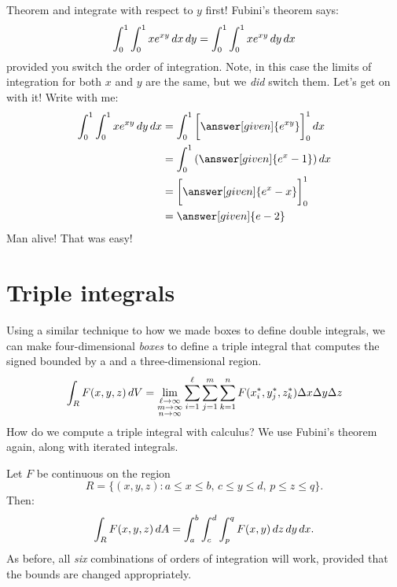 \documentclass{ximera}
\begin{document}
\begin{example}
\begin{explanation}
    Theorem and integrate with respect to $y$ first! Fubini's theorem says:
    \[
    \int_0^1 \int_0^1 x e^{xy} \mathop{}\!d x \mathop{}\!d y =  \int_0^1 \int_0^1 x e^{xy} \mathop{}\!d y \mathop{}\!d x
    \]
    provided you switch the order of integration. Note, in this case
    the limits of integration for both $x$ and $y$ are the same, but
    we \textit{did} switch them. Let's get on with it! Write with me:
    \begin{align*}
      \int_0^1 \int_0^1 x e^{xy} \d y \d x &= \int_0^1 \eval{\answer[given]{e^{xy}}}_0^1\d x\\
      &= \int_0^1 \left(\answer[given]{e^x - 1}\right) \d x \\
      &= \eval{\answer[given]{e^x - x}}_0^1\\
      &= \answer[given]{e-2}
    \end{align*}
    Man alive! That was easy!
  \end{explanation}
\end{example}



\section{Triple integrals}

Using a similar technique to how we made boxes to define double
integrals, we can make four-dimensional \textit{boxes} to define a
triple integral that computes the signed
bounded by a
and a three-dimensional region.
\[
\int_R F(x,y,z) \mathop{}\!d V = \lim_{\substack{\ell\to\infty\\ m\to\infty\\ n\to\infty}}\sum_{i=1}^\ell\sum_{j=1}^m \sum_{k=1}^n F(x^*_i,y^*_j,z_k^*)\Delta x\Delta y\Delta z
\]
How do we compute a triple integral with calculus? We use Fubini's theorem again, along with iterated integrals.

\begin{theorem}
  Let $F$ be continuous on the region
  \[
  R = \{(x,y,z):\text{$a\le x\le b$, $c\le y\le d$, $p\le z\le q$}\}.
  \]
  Then:
  \[
  \int_R F(x,y,z) \mathop{}\!d A  = \int_a^b\int_c^d\int_p^q F(x,y)\mathop{}\!d z \mathop{}\!d y\mathop{}\!d x.
  \]
  As before, all \textit{six} combinations of orders of integration
  will work, provided that the bounds are changed appropriately. 
\end{theorem}
\end{document}
